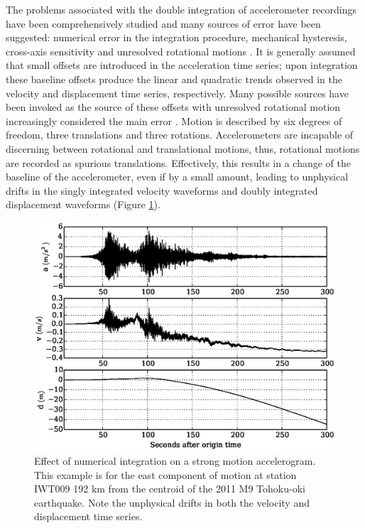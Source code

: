 The problems associated with the double integration of accelerometer recordings have been comprehensively studied and many sources of error have been suggested: numerical error in the integration procedure, mechanical hysteresis, cross-axis sensitivity and unresolved rotational motions \citep{Graizer1979,Iwan1985,Boore1999,Boore2001,Boore2002,Smyth2007}. It is generally assumed that small offsets are introduced in the acceleration time series; upon integration these baseline offsets produce the linear and quadratic trends observed in the velocity and displacement time series, respectively. Many possible sources have been invoked as the source of these offsets with unresolved rotational motion increasingly considered the main error \citep{Graizer2006,Pillet2007}. Motion is described by six degrees of freedom, three translations and three rotations. Accelerometers are incapable of discerning between rotational and translational motions, thus, rotational motions are recorded as spurious translations. Effectively, this results in a change of the baseline of the accelerometer, even if by a small amount, leading to unphysical drifts in the singly integrated velocity waveforms and doubly integrated displacement waveforms (Figure \ref{fig_iwt009}).

\begin{figure}[!ht] 
  \centering
  \includegraphics[width=0.99\linewidth]{./figures/iwt009.eps}
    \caption[Effect of numerical integration on a strong motion recording.]{Effect of numerical integration on a strong motion accelerogram. This example is for the east component of motion at station IWT009 192 km from the centroid of the 2011 M9 Tohoku-oki earthquake. Note the unphysical drifts in both the velocity and displacement time series.}
  \label{fig_iwt009}
\end{figure}

